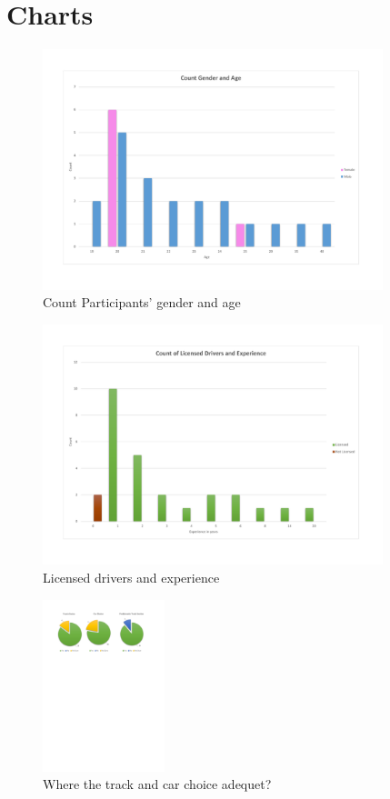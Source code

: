 \section{Charts}

\begin{figure}[!htb]
	\centering
	\includegraphics[height=7cm]{charts/genderAge.pdf}
	\caption[Sample age and gender]{Count Participants' gender and age }
	\label{fig:chart-genderage}
\end{figure}

\begin{figure}[!htb]
	\centering
	\includegraphics[height=7cm]{charts/licenseddriversexperience.pdf}
	\caption[Licensed drivers experience]{Licensed drivers and experience}
	\label{fig:chart-licenseddriversexperience}
\end{figure}

\begin{figure}[!htb]
	\centering
	\includegraphics[height=5cm]{charts/choices.pdf}
	\caption{Where the track and car choice adequet?}
	\label{fig:chart-choices}
\end{figure}


